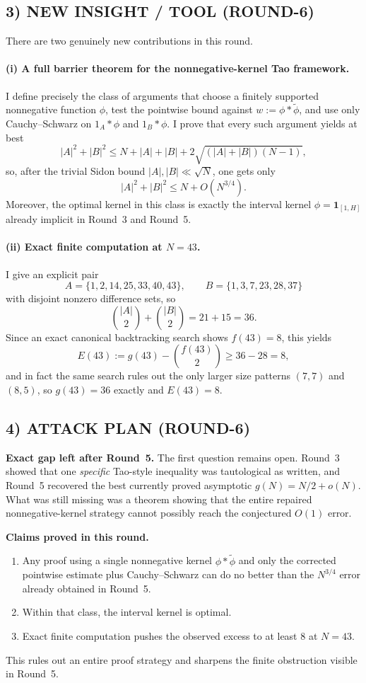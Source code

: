 \subsection{3) NEW INSIGHT / TOOL (ROUND-6)}

There are two genuinely new contributions in this round.

\paragraph{(i) A full barrier theorem for the nonnegative-kernel Tao framework.}
I define precisely the class of arguments that choose a finitely supported nonnegative function $\phi$, test the pointwise bound against $w:=\phi*\widetilde\phi$, and use only Cauchy--Schwarz on $1_A*\phi$ and $1_B*\phi$.  I prove that every such argument yields at best
\[
|A|^2+|B|^2\le N+|A|+|B|+2\sqrt{(|A|+|B|)(N-1)},
\]
so, after the trivial Sidon bound $|A|,|B|\ll \sqrt N$, one gets only
\[
|A|^2+|B|^2\le N+O(N^{3/4}).
\]
Moreover, the optimal kernel in this class is exactly the interval kernel $\phi=\mathbf 1_{[1,H]}$ already implicit in Round~3 and Round~5.

\paragraph{(ii) Exact finite computation at $N=43$.}
I give an explicit pair
\[
A=\{1,2,14,25,33,40,43\},\qquad B=\{1,3,7,23,28,37\}
\]
with disjoint nonzero difference sets, so
\[
\binom{|A|}{2}+\binom{|B|}{2}=21+15=36.
\]
Since an exact canonical backtracking search shows $f(43)=8$, this yields
\[
E(43):=g(43)-\binom{f(43)}2\ge 36-28=8,
\]
and in fact the same search rules out the only larger size patterns $(7,7)$ and $(8,5)$, so $g(43)=36$ exactly and $E(43)=8$.

\subsection{4) ATTACK PLAN (ROUND-6)}

\textbf{Exact gap left after Round~5.}
The first question remains open.  Round~3 showed that one \emph{specific} Tao-style inequality was tautological as written, and Round~5 recovered the best currently proved asymptotic $g(N)=N/2+o(N)$.  What was still missing was a theorem showing that the entire repaired nonnegative-kernel strategy cannot possibly reach the conjectured $O(1)$ error.

\textbf{Claims proved in this round.}
\begin{enumerate}
\item Any proof using a single nonnegative kernel $\phi*\widetilde\phi$ and only the corrected pointwise estimate plus Cauchy--Schwarz can do no better than the $N^{3/4}$ error already obtained in Round~5.
\item Within that class, the interval kernel is optimal.
\item Exact finite computation pushes the observed excess to at least $8$ at $N=43$.
\end{enumerate}
This rules out an entire proof strategy and sharpens the finite obstruction visible in Round~5.

